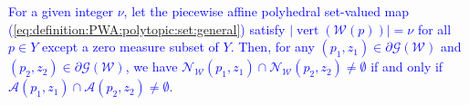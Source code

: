 \documentclass[smallextended]{svjour3}       %
\numberwithin{equation}{section}
\DeclareMathOperator{\vertices}{vert}
\newcommand{\revision}[1]{\textcolor{blue}{#1}}
\begin{document}


%
%





\begin{lemma}\label{lem:active_set}
\revision{For a given integer $\nu$, let the piecewise affine polyhedral set-valued map (\ref{eq:definition:PWA:polytopic:set:general}) satisfy $\lvert \vertices (\mathcal W(p) ) \rvert = \nu$ for all $p\in Y$ except a zero measure subset of $Y$. Then, for any $(p_1,z_1)\in \partial \mathscr G (\mathcal W)$ and $(p_2,z_2)\in \partial \mathscr G (\mathcal W)$, we have $\mathcal N_{\mathcal W}(p_1,z_1) \cap \mathcal N_{\mathcal W}(p_2,z_2) \neq \emptyset$ if and only if $\mathcal A(p_1,z_1) \cap \mathcal A(p_2,z_2)\neq \emptyset$.}
\end{lemma}
\end{document}
